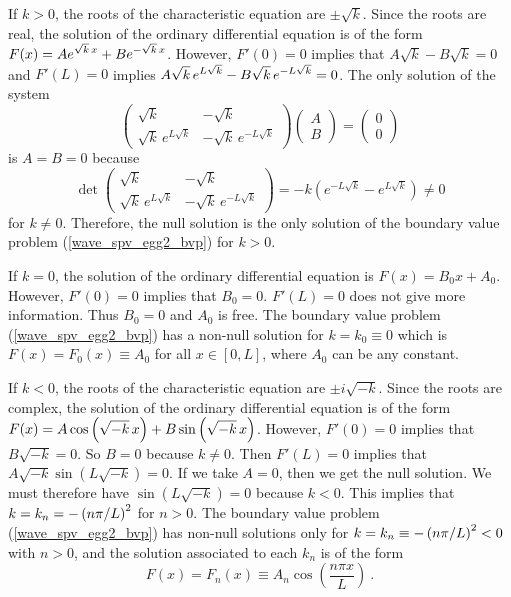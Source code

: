 \begin{egg}
If $k>0$, the roots of the characteristic equation are $\pm \sqrt{k}$.
Since the roots are real, the solution of the ordinary differential
equation is of the form
$\displaystyle F(x) = A e^{\sqrt{k}\,x} + B e^{-\sqrt{k}\, x}$.
However, $F'(0)=0$ implies that $A\sqrt{k} - B\sqrt{k}=0$ and
$F'(L)=0$ implies
$\displaystyle A \sqrt{k}\, e^{L\sqrt{k}} - B \sqrt{k}\, e^{-L\sqrt{k}} = 0$.
The only solution of the system
\[
\begin{pmatrix}
\sqrt{k} & -\sqrt{k} \\ \sqrt{k}\, e^{L\sqrt{k}} & -\sqrt{k}\, e^{-L\sqrt{k}}
\end{pmatrix}
\begin{pmatrix}
A \\ B
\end{pmatrix}
=
\begin{pmatrix}
0 \\ 0
\end{pmatrix}
\]
is $A=B=0$ because
\[
\det
\begin{pmatrix}
\sqrt{k} & -\sqrt{k} \\ \sqrt{k}\, e^{L\sqrt{k}} & -\sqrt{k}\, e^{-L\sqrt{k}}
\end{pmatrix}
= -k \left( e^{-L\sqrt{k}} - e^{L\sqrt{k}}\right) \neq 0
\]
for $k\neq 0$.  Therefore, the null solution is the only solution
of the boundary value problem (\ref{wave_spv_egg2_bvp}) for $k>0$.

If $k=0$, the solution of the ordinary differential equation is
$F(x)=B_0 x+ A_0$.  However, $F'(0)=0$ implies that $B_0=0$.
$F'(L)=0$ does not give more information.  Thus $B_0=0$ and $A_0$ is
free.  The boundary value problem
(\ref{wave_spv_egg2_bvp}) has a non-null solution for $k=k_0 \equiv 0$
which is $F(x) = F_0(x) \equiv A_0$ for all $x\in [0,L]$, where $A_0$ can
be any constant.

If $k<0$, the roots of the characteristic equation are $\pm i \sqrt{-k}$.
Since the roots are complex, the solution of the ordinary differential
equation is of the form $\displaystyle
F(x) = A \cos\left(\sqrt{-k}\,x\right) + B \sin\left(\sqrt{-k}\,x\right)$.
However, $F'(0)=0$ implies that $B \sqrt{-k} =0$.  So $B=0$ because
$k\neq 0$.  Then $F'(L)=0$ implies that
$A \sqrt{-k} \sin\left(L\sqrt{-k}\right) = 0$.  If we take
$A=0$, then we get the null solution.  We must therefore have
$\sin\left(L\sqrt{-k}\right) = 0$ because $k< 0$.  This implies
that $\displaystyle k = k_n = -\left(n\pi/L\right)^2$ for $n>0$.  The
boundary value problem (\ref{wave_spv_egg2_bvp}) has non-null
solutions only for
$\displaystyle k=k_n\equiv -\left(n\pi/L\right)^2<0$ with $n>0$, and
the solution associated to each $k_n$ is of the form
\[
F(x)=F_n(x) \equiv A_n \cos\left(\frac{n\pi x}{L}\right) \ .
\]


\end{egg}
